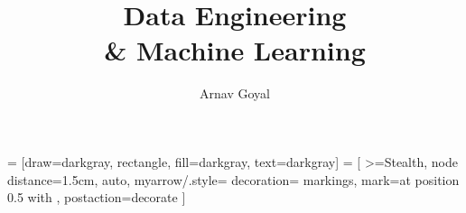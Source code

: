 \lstset{language=C}

\title{Data Engineering \\ \& Machine Learning}
\author{Arnav Goyal}

 = [draw=darkgray, rectangle, fill=darkgray, text=darkgray]
 = [
>=Stealth,
node distance=1.5cm,
auto,
myarrow/.style={
	decoration={
		markings,
		mark=at position 0.5 with {}
	},
	postaction={decorate}
}
]
\usetikzlibrary{positioning, arrows.meta, decorations.markings, decorations.pathreplacing}

\def\myreferences{
	\item Provided Course Material \& Lecture Notes
	\item Neural Networks and Learning Machines - 3e - S. Haykin
}


	\frontmatter
	\maketitle
	\preface
	
	\mainmatter

	
	
	
